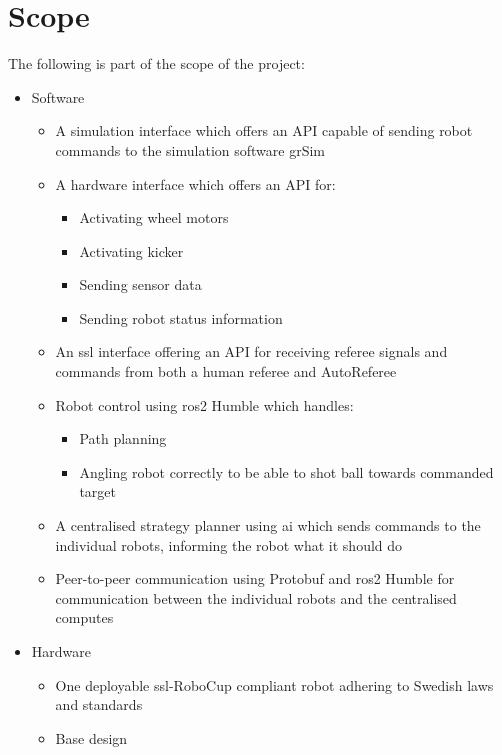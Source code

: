 \section{Scope}
\label{section:scope}

The following is part of the scope of the project:
\begin{itemize}
    \item Software
    \begin{itemize}
        \item A simulation interface which offers an API capable of sending robot commands to the simulation software grSim
        \item A hardware interface which offers an API for:
        \begin{itemize}
            \item Activating wheel motors
            \item Activating kicker
            \item Sending sensor data
            \item Sending robot status information
        \end{itemize}
        \item An \ac{ssl} interface offering an API for receiving referee signals and commands from both a human referee and AutoReferee
        \item Robot control using \ac{ros2} Humble which handles:
        \begin{itemize}
            \item Path planning
            \item Angling robot correctly to be able to shot ball towards commanded target
        \end{itemize}
        \item A centralised strategy planner using \ac{ai} which sends commands to the individual robots, informing the robot what it should do
        \item Peer-to-peer communication using Protobuf and \ac{ros2} Humble for communication between the individual robots and the centralised computes
    \end{itemize}
    \item Hardware
    \begin{itemize}
        \item One deployable \ac{ssl}-RoboCup compliant robot adhering to Swedish laws and standards
        \item Base design

\end{itemize}
\end{itemize}
